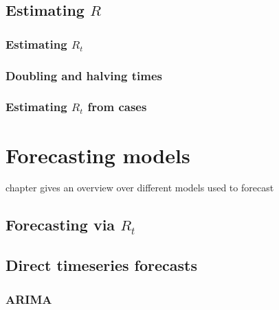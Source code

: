 \documentclass[
]{book}
\begin{document}
\hypertarget{estimating-r}{%
\section{\texorpdfstring{Estimating \(R\)}{Estimating R}}\label{estimating-r}}

\hypertarget{estimating-r_t}{%
\subsection{\texorpdfstring{Estimating \(R_t\)}{Estimating R\_t}}\label{estimating-r_t}}

\hypertarget{doubling-and-halving-times}{%
\subsection{Doubling and halving times}\label{doubling-and-halving-times}}

\hypertarget{estimating-r_t-from-cases}{%
\subsection{\texorpdfstring{Estimating \(R_t\) from cases}{Estimating R\_t from cases}}\label{estimating-r_t-from-cases}}

\hypertarget{forecasting-models}{%
\chapter{Forecasting models}\label{forecasting-models}}

chapter gives an overview over different models used to forecast

\hypertarget{forecasting-via-r_t}{%
\section{\texorpdfstring{Forecasting via \(R_t\)}{Forecasting via R\_t}}\label{forecasting-via-r_t}}

\hypertarget{direct-timeseries-forecasts}{%
\section{Direct timeseries forecasts}\label{direct-timeseries-forecasts}}

\hypertarget{arima}{%
\subsection{ARIMA}\label{arima}}
\end{document}
